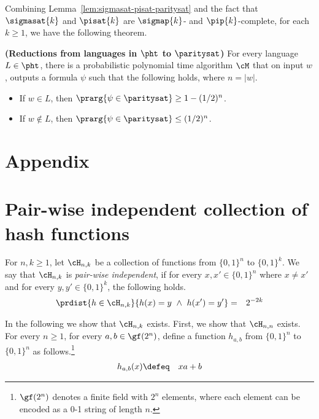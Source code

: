 \documentclass[11pt, a4paper]{article}
\begin{document}
Combining Lemma~\ref{lem:sigmasat-pisat-paritysat} and the fact that
$\sigmasat{k}$ and $\pisat {k}$ are $\sigmap {k}$- and $\pip {k}$-complete, for each $k\geq 1$,
we have the following theorem.

\begin{theorem}
\label{theo:ph-paritysat}
{\bf (Reductions from languages in $\pht$ to $\paritysat$)}
For every language $L \in \pht$, there is a probabilistic polynomial time algorithm $\cM$ that
on input $w$, outputs a formula $\psi$ such that the following holds, where $n=|w|$.
\begin{itemize}
\item
If $w \in L$, then $\prarg { \psi \in \paritysat} \geq 1-(1/2)^n$.
\item
If $w \notin L$, then $\prarg { \psi \in \paritysat} \leq (1/2)^n$.
\end{itemize}
\end{theorem}

\appendix

\section*{Appendix}

\section{Pair-wise independent collection of hash functions}
\label{app:hash}
 
\begin{definition}
\label{def:hash}
For $n,k \geq 1$,
let $\cH_{n,k}$ be a collection of functions from $\{0,1\}^n$ to $\{0,1\}^k$.
We say that $\cH_{n,k}$ is {\em pair-wise independent}, 
if for every $x,x' \in \{0,1\}^n$ where $x\neq x'$ and for every $y,y'\in \{0,1\}^k$,
the following holds.
\begin{eqnarray*}
\prdist {h \in \cH_{n,k}} {h(x)=y \ \wedge \ h(x')=y'} & = & 2^{-2k}
\end{eqnarray*}
\end{definition}

In the following we show that $\cH_{n,k}$ exists.
First, we show that $\cH_{n,n}$ exists.
For every $n\geq 1$, for every $a,b \in \gf(2^n)$,
define a function $h_{a,b}$ from $\{0,1\}^n$ to $\{0,1\}^n$ as follows.\footnote{$\gf(2^n)$ denotes a finite field with $2^n$ elements,
where each element can be encoded as a 0-1 string of length $n$.}
\begin{eqnarray*}
h_{a,b}(x) & \defeq & xa+b
\end{eqnarray*}
\end{document}
